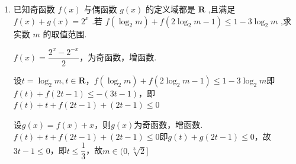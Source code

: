 \begin{enumerate}
\begin{jieda}
\begin{enumerate}
        综上, $a \in (1, 2] \cup \{3, 4\}$
        \item 易知$f(x) = log_2\left(\dfrac{1}{x} + a\right)$的定义域为$\left(-\infty, -\dfrac{1}{a}\right) \cup (0, +\infty)$。$f(x)$在$\left(-\infty, -\dfrac{1}{5}\right), (0, +\infty)$内单调递减 \\
        故在$[t, t+1]$内最大值为$f(t) = log_2\left(\dfrac{1}{t} + a\right)$，最小值为$f(t+1) = log_2\left(\dfrac{1}{t+1} + a\right)$ \\
        故$log_2\left(\dfrac{1}{t} + a\right) - log_2\left(\dfrac{1}{t+1} + a\right) \leq 1$，即$\dfrac{1}{t} + a \leq 2\left(\dfrac{1}{t+1} + a \right) \Longrightarrow \dfrac{1}{t} - \dfrac{2}{t+1} \leq a \Longrightarrow a \geq \dfrac{1-t}{t(t+1)}$
        
        设$h(t) = \dfrac{1-t}{t(t+1)}$，易知$h(t)$分子分母均为正，且分子单调递减，分母单调递增，故在$\left[\dfrac{1}{2}, 1\right]$内单调递减，故$a \geq h\left(\dfrac{1}{2}\right) = \dfrac{2}{3}$
    \end{enumerate}
    \end{jieda}
    
    \item 已知奇函数 $f\left( x\right)$ 与偶函数 $g\left( x\right)$ 的定义域都是 $\mathbf{R}$ ,且满足 $f\left( x\right)  + g\left( x\right)  = {2}^{x}$ .若 $f\left( {{\log }_{2}m}\right)  + f\left( {2{\log }_{2}m - 1}\right)  \leq  1 - 3{\log }_{2}m$ ,求实数 $m$ 的取值范围.
    \begin{jieda}
        $f(x) = \dfrac{2^x-2^{-x}}{2}$，为奇函数，增函数.

        设$t = {\log }_{2}m, t\in \mathbf{R}$，$f\left( {{\log }_{2}m}\right)  + f\left( {2{\log }_{2}m - 1}\right)  \leq  1 - 3{\log }_{2}m$即$f(t) + f(2t-1) \leq -(3t-1)$，即$f(t)+t + f(2t-1)+(2t-1) \leq 0$

        设$g(x) = f(x)+x$，则$g(x)$为奇函数，增函数.$f(t)+t + f(2t-1)+(2t-1) \leq 0$即$g(t)+g(2t-1) \leq 0$，故$3t-1 \leq 0$，即$t \leq \dfrac{1}{3}$，故$m \in (0, \sqrt[3]{2}]$
    \end{jieda}
\end{enumerate}
